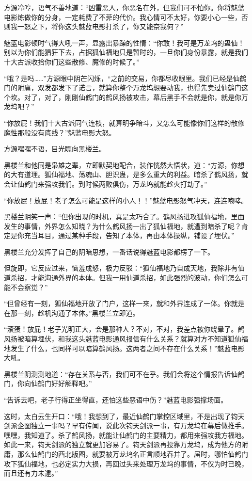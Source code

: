 \begin{this_body}
方源冷哼，语气不善地道：“凶雷恶人，你恶名在外，但我们可不怕你。你将魅蓝电影炼做你的分身，一定耗费了不菲的代价。我心情可不太好，你要小心一些，否则我一怒之下，将你这头魅蓝电影打杀了，你又能奈我何？”

魅蓝电影顿时气得大吼一声，显露出暴躁的性情：“你敢！我可是万龙坞的蛊仙！别以为你们能猖狂下去，占据狐仙福地只是暂时的，一旦你们身份暴露，就是我们十大古派收拾你们这些散修、魔修的时候了。”

“哦？是吗……”方源眼中阴芒闪烁，“之前的交易，你都尽收眼里。我们已经是仙鹤门的附庸，双发都发下了诺言，就算你整个万龙坞想要动我，也得先卖过仙鹤门这个坎。对了，对了，刚刚仙鹤门的鹤风扬被攻击，幕后黑手不会就是你，就是你万龙坞吧？”

“你放屁！我们十大古派同气连枝，就算明争暗斗，又怎么可能像你们这样的散修魔性那般没有底线？”魅蓝电影大怒。

方源嘿嘿不语，目光瞟向黑楼兰。

黑楼兰和他同是枭雄之辈，立即默契地配合，装作恍然大悟状，道：“方源，你想的大有道理。狐仙福地、荡魂山、胆识蛊，是多么重大的利益。暗杀了鹤风扬，就会让仙鹤门来强攻我们。到时候两败俱伤，万龙坞就能趁火打劫了。”

“你放屁！放屁！老子怎么可能是这样的小人！！”魅蓝电影怒气冲天，连连咆哮。

黑楼兰阴笑一声：“但你出现的时机，真是太巧合了。鹤风扬进攻狐仙福地，里面发生的事情，外界怎么知晓？为什么鹤风扬一出了狐仙福地，就遭到暗杀了呢？肯定是你充当耳目，通过某种手段，告知了本体，再由本体操纵，铺设了埋伏。”

黑楼兰充分发挥了自己的阴暗思想，一番话说得魅蓝电影都楞了一下。

但旋即，它反应过来，恼羞成怒，极力反驳：“狐仙福地乃自成天地，我除非有仙道杀招，才能沟通外界的本体。但我一用仙道杀招，如此强烈的波动，你们怎么可能不会察觉？”

“但曾经有一刻，狐仙福地开放了门户，这样一来，就和外界连成了一体。你就是在那一刻，趁机沟通了本体。”黑楼兰立即道。

“滚蛋！放屁！老子光明正大，会是那种人？不对，不对，我差点被你绕晕了。鹤风扬被暗算埋伏，和我这头魅蓝电影通风报信有什么关系？就算对方不知道狐仙福地发生了什么，也同样可以暗算鹤风扬。这两者之间不存在什么关系！”魅蓝电影大吼。

黑楼兰阴测测地道：“存在关系与否，我们可不在乎。我们会将这个情报告诉仙鹤门，你向仙鹤门好好解释吧。”

“告诉去吧，老子行得正坐得直，还怕这些恶语中伤？”魅蓝电影强撑场面。

这时，太白云生开口：“哦！我想到了，最近仙鹤门掌控区域里，不是出现了钧天剑派企图独立一事吗？早有传闻，说此次钧天剑派一事，有万龙坞在幕后做推手。嘿嘿，我知道了。杀了鹤风扬，就能让仙鹤门的主要精力，都用来强攻我方福地。如此一来，钧天剑派的独立就更加容易了。钧天剑派再投靠万龙坞，成为他方的附庸，那么仙鹤门的西北版图，就要被万龙坞名正言顺地吞并了。届时，哪怕仙鹤门攻下狐仙福地，也必定实力大损，再回过头来处理万龙坞的事情，不仅为时已晚，而且还有力未逮。”


\end{this_body}

